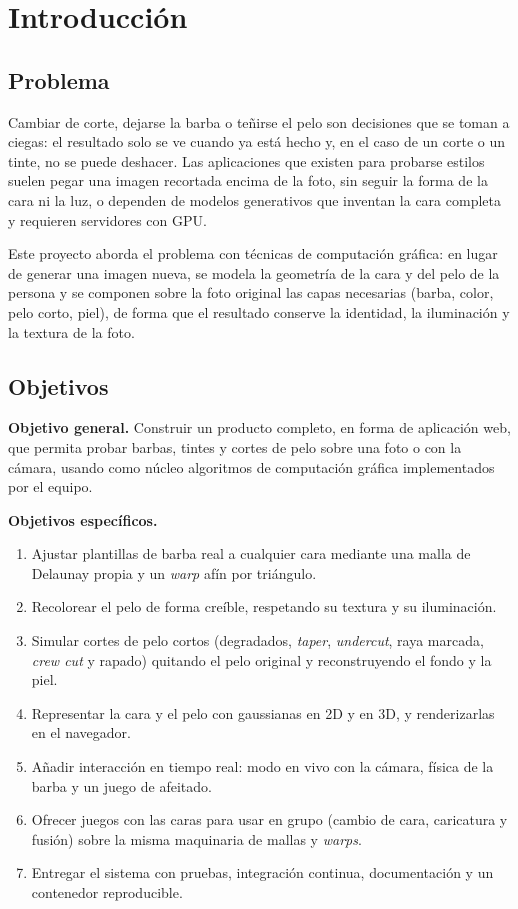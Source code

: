 \section{Introducción}

\subsection{Problema}

Cambiar de corte, dejarse la barba o teñirse el pelo son decisiones que se toman a ciegas: el resultado solo se ve cuando ya está hecho y, en el caso de un corte o un tinte, no se puede deshacer. Las aplicaciones que existen para probarse estilos suelen pegar una imagen recortada encima de la foto, sin seguir la forma de la cara ni la luz, o dependen de modelos generativos que inventan la cara completa y requieren servidores con GPU.

Este proyecto aborda el problema con técnicas de computación gráfica: en lugar de generar una imagen nueva, se modela la geometría de la cara y del pelo de la persona y se componen sobre la foto original las capas necesarias (barba, color, pelo corto, piel), de forma que el resultado conserve la identidad, la iluminación y la textura de la foto.

\subsection{Objetivos}

\textbf{Objetivo general.} Construir un producto completo, en forma de aplicación web, que permita probar barbas, tintes y cortes de pelo sobre una foto o con la cámara, usando como núcleo algoritmos de computación gráfica implementados por el equipo.

\textbf{Objetivos específicos.}
\begin{enumerate}
  \item Ajustar plantillas de barba real a cualquier cara mediante una malla de Delaunay propia y un \emph{warp} afín por triángulo.
  \item Recolorear el pelo de forma creíble, respetando su textura y su iluminación.
  \item Simular cortes de pelo cortos (degradados, \emph{taper}, \emph{undercut}, raya marcada, \emph{crew cut} y rapado) quitando el pelo original y reconstruyendo el fondo y la piel.
  \item Representar la cara y el pelo con gaussianas en 2D y en 3D, y renderizarlas en el navegador.
  \item Añadir interacción en tiempo real: modo en vivo con la cámara, física de la barba y un juego de afeitado.
  \item Ofrecer juegos con las caras para usar en grupo (cambio de cara, caricatura y fusión) sobre la misma maquinaria de mallas y \emph{warps}.
  \item Entregar el sistema con pruebas, integración continua, documentación y un contenedor reproducible.
\end{enumerate}

